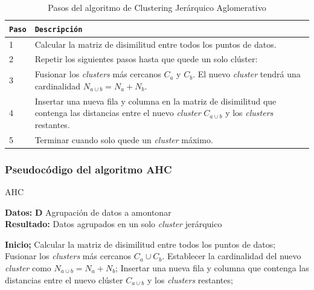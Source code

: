 \begin{table}[H]
\footnotesize
\centering
\begin{tabular}{|l|p{12cm}|}
\hline
\rowcolor{graylight} \texttt{Paso} & \texttt{Descripción} \\
\hline
1 & Calcular la matriz de disimilitud entre todos los puntos de datos. \\
\hline
2 & Repetir los siguientes pasos hasta que quede un solo clúster: \\
\hline
3 & Fusionar los \textit{clusters} más cercanos \( C_a \) y \( C_b \). El nuevo \textit{cluster} tendrá una cardinalidad \( N_{a \cup b} = N_a + N_b \). \\
\hline
4 & Insertar una nueva fila y columna en la matriz de disimilitud que contenga las distancias entre el nuevo \textit{cluster} \( C_{a \cup b} \) y los \textit{clusters} restantes. \\
\hline
5 & Terminar cuando solo quede un \textit{cluster} máximo. \\
\hline
\end{tabular}
\caption{Pasos del algoritmo de Clustering Jerárquico Aglomerativo}
\end{table}


\vspace{-3mm}

\subsubsection*{Pseudocódigo del algoritmo \gls{AHC}}

\vspace{-3mm}

\begin{algorithm}[H]
\footnotesize
\caption{AHC}
\textbf{Datos:} \textbf{D} Agrupación de datos a amontonar\\
\textbf{Resultado:} Datos agrupados en un solo \textit{cluster} jerárquico
\begin{algorithmic}[1]
\State \textbf{Inicio;}
\State Calcular la matriz de disimilitud entre todos los puntos de datos;
\Repeat
    \State Fusionar los \textit{clusters} más cercanos $C_a \cup C_b$. Establecer la cardinalidad del nuevo \textit{cluster} como $N_{a \cup b} = N_a + N_b$;
    \State Insertar una nueva fila y columna que contenga las distancias entre el nuevo clúster $C_{a \cup b}$ y los \textit{clusters} restantes;
\end{algorithmic}
\end{algorithm}

